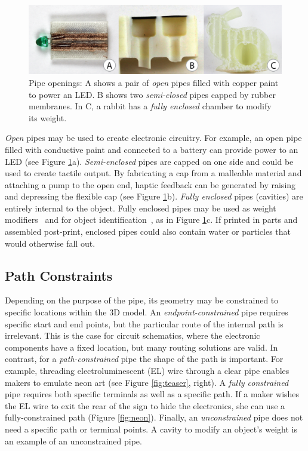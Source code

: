\begin{figure}[t]
\centering
    \includegraphics[width=1.0\columnwidth]{figures/types.png}
\caption{Pipe openings: A shows a pair of \emph{open} pipes filled with copper paint to power an LED.  B shows two \emph{semi-closed} pipes capped by rubber membranes.  In C, a rabbit has a \emph{fully enclosed} chamber to modify its weight.}
\label{fig:openings}
\end{figure}

\emph{Open} pipes may be used to create electronic circuitry.  For example, an open pipe filled with conductive paint and connected to a battery can provide power to an LED (see Figure \ref{fig:openings}a).
%
\emph{Semi-enclosed} pipes are capped on one side and could be used to create tactile output. By fabricating a cap from a malleable material and attaching a pump to the open end, haptic feedback can be generated by raising and depressing the flexible cap (see Figure \ref{fig:openings}b).
%
\emph{Fully enclosed} pipes (cavities) are entirely internal to the object.  Fully enclosed pipes may be used as weight modifiers~\cite{Prevost-makeitstand} and for object identification~\cite{Willis-infrastructs}, as in Figure \ref{fig:openings}c.  If printed in parts and assembled post-print, enclosed pipes could also contain water or particles that would otherwise fall out.

\subsection{Path Constraints}
Depending on the purpose of the pipe, its geometry may be constrained to specific locations within the 3D model. An \emph{endpoint-constrained} pipe requires specific start and end points, but the particular route of the internal path is irrelevant. This is the case for circuit schematics, where the electronic components have a fixed location, but many routing solutions are valid. In contrast, for a \emph{path-constrained} pipe the shape of the path is important. For example, threading electroluminescent (EL) wire through a clear pipe enables makers to emulate neon art (see Figure \ref{fig:teaser}, right). A \emph{fully constrained} pipe requires both specific terminals as well as a specific path. If a maker wishes the EL wire to exit the rear of the sign to hide the electronics, she can use a fully-constrained path (Figure \ref{fig:neon}). Finally, an \emph{unconstrained} pipe does not need a specific path or terminal points. A cavity to modify an object's weight is an example of an unconstrained pipe.

